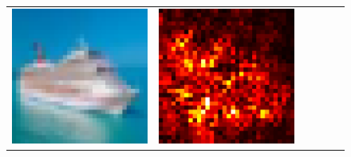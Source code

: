 \documentclass[preprint,12pt]{elsarticle}
\begin{document}
\begin{figure}[p]
\begin{tabular}{cccccc}
  \includegraphics[scale=\scale]{../visualizations/examples/cifar10/resnet18/images/8.png} &
  \includegraphics[scale=\scale]{../visualizations/examples/cifar10/resnet18/saliency_map/8.png} & 

\end{tabular}
\end{figure}
\end{document}
